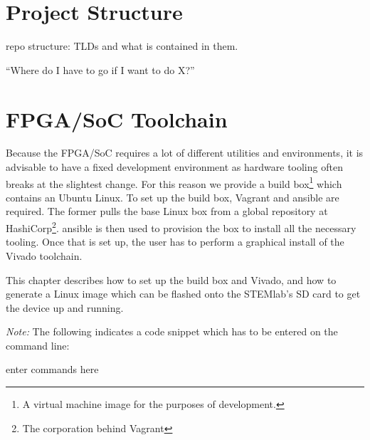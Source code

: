 %
%
\chapter{Project Structure} %
\label{ch:devguide:project_structure}

repo structure: TLDs and what is contained in them.

``Where do I have to go if I want to do X?''

%
%
\chapter{FPGA/SoC Toolchain} %
\label{ch:devguide:fpga_toolchain}

Because the FPGA/SoC requires a lot of different utilities and environments, it
is advisable to  have a fixed development environment as  hardware tooling often
breaks at the slightest change.
For this reason we  provide a build box\footnote{%
    A virtual machine image for the purposes of development.
}
which contains  an Ubuntu Linux. To set  up the build box, Vagrant  and ansible
are required.  The former pulls the base Linux box from a global repository at
HashiCorp\footnote{The corporation  behind Vagrant}.  ansible is then  used to
provision the box  to install all the necessary tooling. Once  that is set up,
the user has to perform a graphical install of the Vivado toolchain.

This chapter  describes how to  set up  the build box  and Vivado, and  how to
generate a Linux image which can be  flashed onto the STEMlab's SD card to get
the device up and running.

\emph{Note:} The following indicates a code snippet which has to be entered on
the command line:
\begin{commandshell}
    enter commands here
\end{commandshell}


